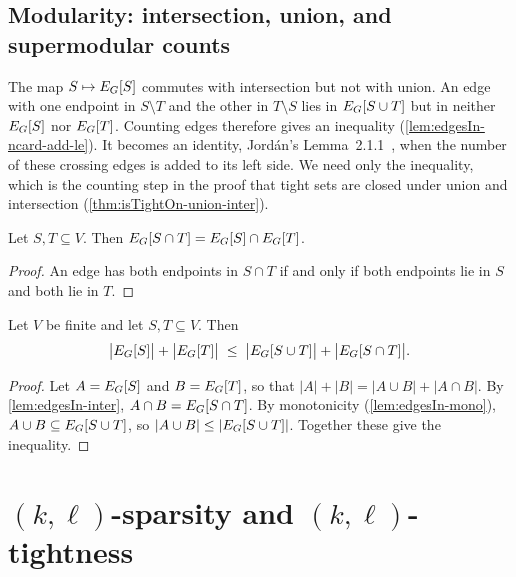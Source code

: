 \subsection{Modularity: intersection, union, and supermodular counts}

The map $S \mapsto E_{G}[S]$ commutes with intersection but not with
union. An edge with one endpoint in $S \setminus T$ and the other in
$T \setminus S$ lies in $E_{G}[S \cup T]$ but in neither
$E_{G}[S]$ nor $E_{G}[T]$. Counting edges therefore gives an
inequality (\cref{lem:edgesIn-ncard-add-le}). It becomes an identity,
Jord\'an's Lemma~2.1.1~\cite{jordan2016}, when the number of these
crossing edges is added to its left side. We need only the inequality,
which is the counting step in the proof that tight sets are closed
under union and intersection (\cref{thm:isTightOn-union-inter}).

\begin{lemma}
  \label{lem:edgesIn-inter}
  \leanok
  Let $S, T \subseteq V$. Then
  $E_{G}[S \cap T] = E_{G}[S] \cap E_{G}[T]$.
\end{lemma}
\begin{proof}
  \leanok
  An edge has both endpoints in $S \cap T$ if and only if both
  endpoints lie in $S$ and both lie in $T$.
\end{proof}

\begin{lemma}
  \label{lem:edgesIn-ncard-add-le}
  \leanok
  Let $V$ be finite and let $S, T \subseteq V$. Then
  \[
    \bigl|E_{G}[S]\bigr| + \bigl|E_{G}[T]\bigr|
    \;\le\;
    \bigl|E_{G}[S \cup T]\bigr| + \bigl|E_{G}[S \cap T]\bigr|.
  \]
\end{lemma}
\begin{proof}
  \leanok
  Let $A = E_{G}[S]$ and $B = E_{G}[T]$, so that
  $|A| + |B| = |A \cup B| + |A \cap B|$. By \cref{lem:edgesIn-inter},
  $A \cap B = E_{G}[S \cap T]$. By monotonicity
  (\cref{lem:edgesIn-mono}), $A \cup B \subseteq E_{G}[S \cup T]$, so
  $|A \cup B| \le |E_{G}[S \cup T]|$. Together these give the
  inequality.
\end{proof}

\section{\texorpdfstring{$(k,\ell)$}{(k,l)}-sparsity and \texorpdfstring{$(k,\ell)$}{(k,l)}-tightness}
\label{sec:sparsity}

